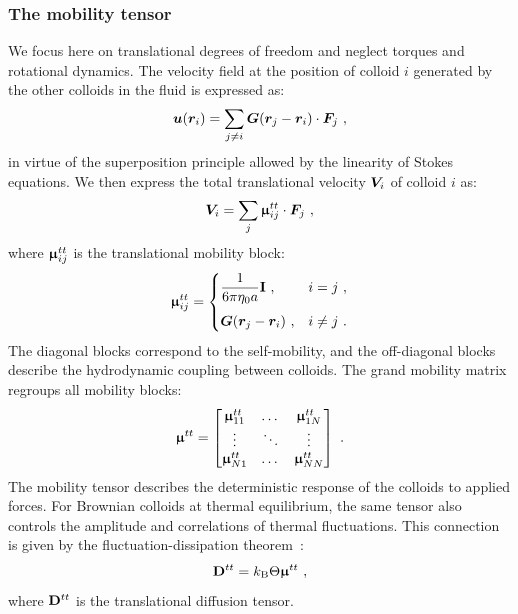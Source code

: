 \subsubsection{The mobility tensor}
We focus here on translational degrees of freedom and neglect torques and rotational dynamics. The velocity field at the position of colloid $i$ generated by the other colloids in the fluid is expressed as:
\begin{equation}
\bm{u}(\bm{r}_i) =
\sum_{j\neq i}
\bm{G}(\bm{r}_j-\bm{r}_i)\cdot \bm{F}_j~,
\end{equation}
in virtue of the superposition principle allowed by the linearity of Stokes equations. We then express the total translational velocity $\bm{V}_i$ of colloid $i$ as:
\begin{equation}
\bm{V}_i=\sum_j\bm{\upmu}_{ij}^{tt}\cdot \bm{F}_j~,
\end{equation}
where $\bm{\upmu}_{ij}^{tt}$ is the translational mobility block:
\begin{equation}
\bm{\upmu}_{ij}^{tt} =\begin{cases}
\dfrac{1}{6\pi\eta_0 a}\mathbf{I}~,& i=j~, \\[1em]
\bm{G}(\bm{r}_j-\bm{r}_i)~,& i\neq j~.
\end{cases}
\label{eq:oseen_mobility_pair}
\end{equation}
The diagonal blocks correspond to the self-mobility, and the off-diagonal blocks describe the hydrodynamic coupling between colloids. The grand mobility matrix regroups all mobility blocks:
\begin{equation}
\bm{\upmu}^{tt}=
\begin{bmatrix}
\bm{\upmu}^{tt}_{11} & \dots & \bm{\upmu}^{tt}_{1N} \\
\vdots & \ddots & \vdots \\
\bm{\upmu}^{tt}_{N1} & \dots & \bm{\upmu}^{tt}_{NN}
\end{bmatrix}~.
\end{equation}
 The mobility tensor describes the deterministic response of the colloids to applied forces. For Brownian colloids at thermal equilibrium, the same tensor also controls the amplitude and correlations of thermal fluctuations. This connection is given by the fluctuation-dissipation theorem~\cite{einstein_uber_1905,kubo1966}:
\begin{equation}
\mathbf{D}^{tt}=k_\mathrm B \Theta\bm{\upmu}^{tt}~,
\label{mat:D_oseen}
\end{equation}
where $\mathbf{D}^{tt}$ is the translational diffusion tensor.

